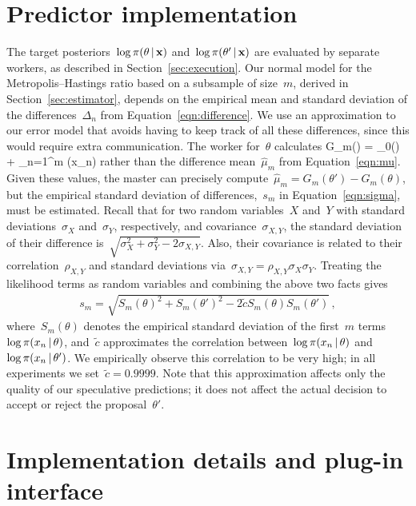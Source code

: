 \documentclass[angelino.tex]{subfiles}
\begin{document}
\section{Predictor implementation}
\label{sec:predictor-implementation}

The target posteriors~$\log\pi(\theta\,|\,\mathbf{x})$ and~$\log\pi(\theta'\,|\,\mathbf{x})$
are evaluated by separate workers, as described in Section~\ref{sec:execution}.
%
Our normal model for the Metropolis--Hastings ratio based on a subsample of size~$m$,
derived in Section~\ref{sec:estimator}, depends on the empirical mean and
standard deviation of the differences~$\Delta_n$ from Equation~\ref{eqn:difference}.
%
We use an approximation to our error model that avoids having to
keep track of all these differences, since this would require extra communication.
%
The worker for~$\theta$ calculates
%
\be
  G_m(\theta) = \log\pi_0(\theta) + \sum_{n=1}^m \log\pi(x_n\given\theta)
  \label{eqn:implmu}
\ee
%
rather than the difference mean~$\hat\mu_m$ from Equation~\ref{eqn:mu}.
%
Given these values, the master can precisely
compute~${\hat{\mu}_m = G_m(\theta') - G_m(\theta)}$,
but the empirical standard deviation of differences,~$s_m$ in
Equation~\ref{eqn:sigma}, must be estimated.
%
Recall that for two random variables~$X$ and~$Y$ with
standard deviations~$\sigma_X$ and~$\sigma_Y$, respectively,
and covariance~$\sigma_{X,Y}$, the standard deviation of their
difference is~$\sqrt{\sigma_X^2 + \sigma_Y^2 - 2\sigma_{X,Y}}$.
%
Also, their covariance is related to their correlation~$\rho_{X,Y}$ and
standard deviations via~${\sigma_{X,Y} = \rho_{X,Y} \sigma_X  \sigma_Y}$.
%
Treating the likelihood terms as random variables and combining the above two facts gives
%
\begin{align}
s_m = \sqrt{S_m(\theta)^2 + S_m(\theta')^2 - 2 \tilde{c} S_m(\theta) S_m(\theta')}\,,
\end{align}
%
where~$S_m(\theta)$ denotes the empirical standard deviation of
the first~$m$ terms~$\log \pi(x_n \,|\, \theta)$, and~$\tilde{c}$
approximates the correlation between~$\log \pi(x_n \,|\, \theta)$
and~$\log \pi(x_n \,|\, \theta')$.
%
We empirically observe this correlation to be very high;
in all experiments we set~$\tilde{c} = 0.9999$.
%
Note that this approximation affects only the quality of our speculative
predictions; it does not affect the actual decision to accept or reject the
proposal~$\theta'$.

\section{Implementation details and plug-in interface}
\end{document}
